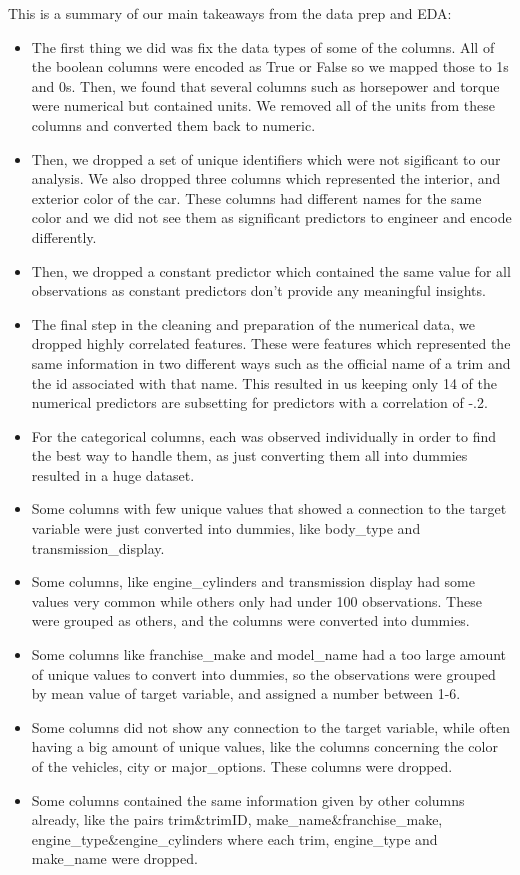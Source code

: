 \documentclass[
  letterpaper,
  DIV=11,
  numbers=noendperiod]{scrartcl}
\begin{document}
This is a summary of our main takeaways from the data prep and EDA:

\begin{itemize}
\item
  The first thing we did was fix the data types of some of the columns.
  All of the boolean columns were encoded as True or False so we mapped
  those to 1s and 0s. Then, we found that several columns such as
  horsepower and torque were numerical but contained units. We removed
  all of the units from these columns and converted them back to
  numeric.
\item
  Then, we dropped a set of unique identifiers which were not sigificant
  to our analysis. We also dropped three columns which represented the
  interior, and exterior color of the car. These columns had different
  names for the same color and we did not see them as significant
  predictors to engineer and encode differently.
\item
  Then, we dropped a constant predictor which contained the same value
  for all observations as constant predictors don't provide any
  meaningful insights.
\item
  The final step in the cleaning and preparation of the numerical data,
  we dropped highly correlated features. These were features which
  represented the same information in two different ways such as the
  official name of a trim and the id associated with that name. This
  resulted in us keeping only 14 of the numerical predictors are
  subsetting for predictors with a correlation of \textbar-.2\textbar.
\item
  For the categorical columns, each was observed individually in order
  to find the best way to handle them, as just converting them all into
  dummies resulted in a huge dataset.
\item
  Some columns with few unique values that showed a connection to the
  target variable were just converted into dummies, like body\_type and
  transmission\_display.
\item
  Some columns, like engine\_cylinders and transmission display had some
  values very common while others only had under 100 observations. These
  were grouped as others, and the columns were converted into dummies.
\item
  Some columns like franchise\_make and model\_name had a too large
  amount of unique values to convert into dummies, so the observations
  were grouped by mean value of target variable, and assigned a number
  between 1-6.
\item
  Some columns did not show any connection to the target variable, while
  often having a big amount of unique values, like the columns
  concerning the color of the vehicles, city or major\_options. These
  columns were dropped.
\item
  Some columns contained the same information given by other columns
  already, like the pairs trim\&trimID, make\_name\&franchise\_make,
  engine\_type\&engine\_cylinders where each trim, engine\_type and
  make\_name were dropped.
\end{itemize}
\end{document}
